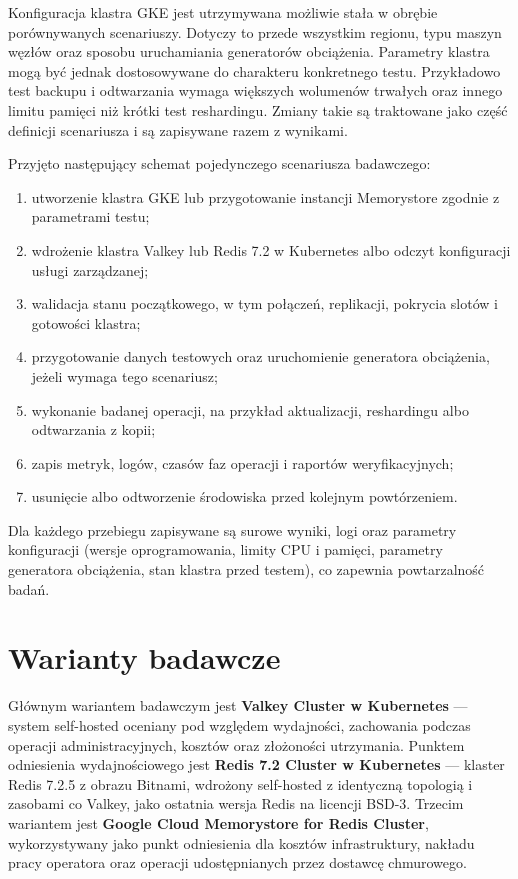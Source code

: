 Konfiguracja klastra GKE jest utrzymywana możliwie stała w obrębie porównywanych scenariuszy. Dotyczy to przede wszystkim regionu, typu maszyn węzłów oraz sposobu uruchamiania generatorów obciążenia. Parametry klastra mogą być jednak dostosowywane do charakteru konkretnego testu. Przykładowo test backupu i odtwarzania wymaga większych wolumenów trwałych oraz innego limitu pamięci niż krótki test reshardingu. Zmiany takie są traktowane jako część definicji scenariusza i są zapisywane razem z wynikami.

Przyjęto następujący schemat pojedynczego scenariusza badawczego:

\begin{enumerate}
    \item utworzenie klastra GKE lub przygotowanie instancji Memorystore zgodnie z parametrami testu;
    \item wdrożenie klastra Valkey lub Redis 7.2 w Kubernetes albo odczyt konfiguracji usługi zarządzanej;
    \item walidacja stanu początkowego, w tym połączeń, replikacji, pokrycia slotów i gotowości klastra;
    \item przygotowanie danych testowych oraz uruchomienie generatora obciążenia, jeżeli wymaga tego scenariusz;
    \item wykonanie badanej operacji, na przykład aktualizacji, reshardingu albo odtwarzania z kopii;
    \item zapis metryk, logów, czasów faz operacji i raportów weryfikacyjnych;
    \item usunięcie albo odtworzenie środowiska przed kolejnym powtórzeniem.
\end{enumerate}

Dla każdego przebiegu zapisywane są surowe wyniki, logi oraz parametry konfiguracji (wersje oprogramowania, limity CPU i pamięci, parametry generatora obciążenia, stan klastra przed testem), co zapewnia powtarzalność badań.

\section{Warianty badawcze}

Głównym wariantem badawczym jest \textbf{Valkey Cluster w Kubernetes} --- system self-hosted oceniany pod względem wydajności, zachowania podczas operacji administracyjnych, kosztów oraz złożoności utrzymania. Punktem odniesienia wydajnościowego jest \textbf{Redis 7.2 Cluster w Kubernetes} --- klaster Redis 7.2.5 z obrazu Bitnami, wdrożony self-hosted z identyczną topologią i zasobami co Valkey, jako ostatnia wersja Redis na licencji BSD-3. Trzecim wariantem jest \textbf{Google Cloud Memorystore for Redis Cluster}, wykorzystywany jako punkt odniesienia dla kosztów infrastruktury, nakładu pracy operatora oraz operacji udostępnianych przez dostawcę chmurowego.

